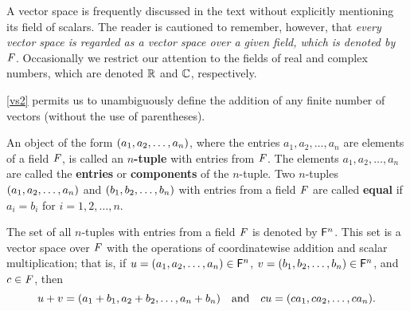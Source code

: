 \begin{note}
  A vector space is frequently discussed in the text without explicitly mentioning its field of scalars.
  The reader is cautioned to remember, however, that \emph{every vector space is regarded as a vector space over a given field, which is denoted by \(\mathit{F}\)}.
  Occasionally we restrict our attention to the fields of real and complex numbers, which are denoted \(\mathbb{R}\) and \(\mathbb{C}\), respectively.
\end{note}

\begin{note}
  \ref{vs2} permits us to unambiguously define the addition of any finite number of vectors
  (without the use of parentheses).
\end{note}

\begin{defn}\label{1.2.3}
  An object of the form \({\left\lparen{a}_{1}, {a}_{2}, \dots, {a}_{n}\right\rparen}\), where the entries \(a_{1}, a_{2}, \dots, a_{n}\) are elements of a field \(\mathit{F}\), is called an \textbf{\(n\)-tuple} with entries from \(\mathit{F}\).
  The elements \(a_{1}, a_{2}, \dots, a_{n}\) are called the \textbf{entries} or \textbf{components} of the \(n\)-tuple.
  Two \(n\)-tuples \({\left\lparen{a}_{1}, {a}_{2}, \dots, {a}_{n}\right\rparen}\) and \({\left\lparen{b}_{1}, {b}_{2}, \dots, {b}_{n}\right\rparen}\) with entries from a field \(\mathit{F}\) are called \textbf{equal} if \(a_i = b_i\) for \(i = 1, 2, \dots, n\).
\end{defn}

\begin{eg}\label{1.2.4}
  The set of all \(n\)-tuples with entries from a field \(\mathit{F}\) is denoted by \(\mathsf{F}^{n}\).
  This set is a vector space over \(\mathit{F}\) with the operations of coordinatewise addition and scalar multiplication;
  that is, if \(u = {\left\lparen{a}_{1}, {a}_{2}, \dots, {a}_{n}\right\rparen} \in \mathsf{F}^{n}\), \(v = {\left\lparen{b}_{1}, {b}_{2}, \dots, {b}_{n}\right\rparen} \in \mathsf{F}^{n}\), and \(c \in \mathit{F}\), then
  \[
    u + v = (a_{1} + b_{1}, a_{2} + b_{2}, \dots, a_{n} + b_{n}) \quad \text{and} \quad cu = {\left\lparen{ca}_{1}, {ca}_{2}, \dots, {ca}_{n}\right\rparen}.
  \]
\end{eg}

